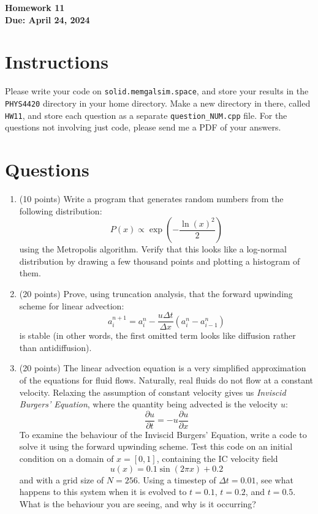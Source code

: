 \documentclass[11pt]{article}
\begin{document}
\begin{center}
\textbf{\Large Homework 11}\\
\textbf{Due: April 24, 2024}\\
\end{center}
\section*{Instructions}
Please write your code on \texttt{solid.memgalsim.space}, and store your results
in the \texttt{PHYS4420} directory in your home directory.  Make a new directory
in there, called \texttt{HW11}, and store each question as a separate
\texttt{question\_NUM.cpp} file.  For the questions not involving just code,
please send me a PDF of your answers.


\section*{Questions}
\begin{enumerate}
    \item (10 points) Write a program that generates random numbers from the
        following distribution:
        $$ P(x) \propto \exp\left(-\frac{\ln(x)^2}{2}\right) $$
        using the Metropolis algorithm.  Verify that this looks like a
        log-normal distribution by drawing a few thousand points and plotting a
        histogram of them.

    \item (20 points) Prove, using truncation analysis, that the forward
        upwinding scheme for linear advection:
        $$ a_i^{n+1} = a_i^n - \frac{u\Delta t}{\Delta x}\left(a_i^n -
        a_{i-1}^n\right)$$
        is stable (in other words, the first omitted term looks like diffusion
        rather than antidiffusion).

    \item (20 points) The linear advection equation is a very simplified
        approximation of the equations for fluid flows.  Naturally, real fluids
        do not flow at a constant velocity.  Relaxing the assumption of constant
        velocity gives us \textit{Inviscid Burgers' Equation}, where the quantity being
        advected is the velocity $u$:
        $$ \frac{\partial u}{\partial t} = -u\frac{\partial u}{\partial x} $$
        To examine the behaviour of the Inviscid Burgers' Equation, write a code
        to solve it using the forward upwinding scheme.  Test this code on an
        initial condition on a domain of $x=[0,1]$, containing the IC velocity
        field
        $$ u(x) = 0.1\sin(2\pi x) + 0.2 $$
        and with a grid size of $N=256$.  Using a timestep of $\Delta t=0.01$,
        see what happens to this system when it is evolved to $t=0.1$, $t=0.2$,
        and $t=0.5$.  What is the behaviour you are seeing, and why is it
        occurring?
\end{enumerate}
\end{document}
